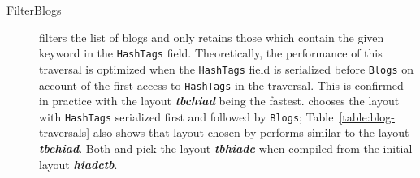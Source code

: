 \begin{description}

\item[FilterBlogs]
filters the list of blogs and only retains those which contain the given
keyword in the \lstinline{HashTags} field. %
%
%
%
%
Theoretically, the performance of this traversal is optimized when the \lstinline{HashTags} field is serialized before \lstinline{Blogs} on account of the first access to \lstinline{HashTags} in the traversal.
%
This is confirmed in practice with the layout \textbf{\textit{tbchiad}} being the fastest.
%
%
\system chooses the layout with \lstinline{HashTags} serialized first and followed by \lstinline{Blogs};
Table~\ref{table:blog-traversals} also shows that layout chosen by \system performs similar to the layout \textbf{\textit{tbchiad}}.
Both \systemSolver and \systemGreedy pick the layout \textbf{\textit{tbhiadc}} when compiled from the initial layout \textbf{\textit{hiadctb}}.


\end{description}
